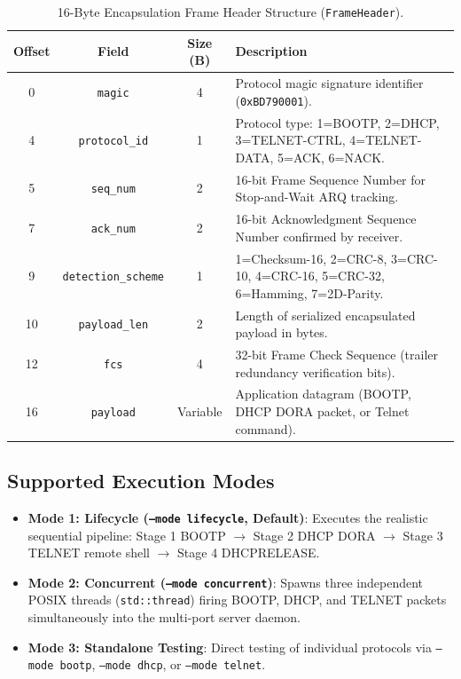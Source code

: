 \documentclass[12pt, a4paper]{article}
\begin{document}
\begin{table}[H]
\centering
\small
\begin{tabularx}{\linewidth}{|c|c|c|X|}
\hline
\textbf{Offset} & \textbf{Field} & \textbf{Size (B)} & \textbf{Description} \\ \hline
0 & \texttt{magic} & 4 & Protocol magic signature identifier (\texttt{0xBD790001}). \\ \hline
4 & \texttt{protocol\_id} & 1 & Protocol type: 1=BOOTP, 2=DHCP, 3=TELNET-CTRL, 4=TELNET-DATA, 5=ACK, 6=NACK. \\ \hline
5 & \texttt{seq\_num} & 2 & 16-bit Frame Sequence Number for Stop-and-Wait ARQ tracking. \\ \hline
7 & \texttt{ack\_num} & 2 & 16-bit Acknowledgment Sequence Number confirmed by receiver. \\ \hline
9 & \texttt{detection\_scheme} & 1 & 1=Checksum-16, 2=CRC-8, 3=CRC-10, 4=CRC-16, 5=CRC-32, 6=Hamming, 7=2D-Parity. \\ \hline
10 & \texttt{payload\_len} & 2 & Length of serialized encapsulated payload in bytes. \\ \hline
12 & \texttt{fcs} & 4 & 32-bit Frame Check Sequence (trailer redundancy verification bits). \\ \hline
16 & \texttt{payload} & Variable & Application datagram (BOOTP, DHCP DORA packet, or Telnet command). \\ \hline
\end{tabularx}
\caption{16-Byte Encapsulation Frame Header Structure (\texttt{FrameHeader}).}
\label{tab:frame_layout}
\end{table}

\subsection{Supported Execution Modes}
\begin{itemize}
    \item \textbf{Mode 1: Lifecycle (\texttt{--mode lifecycle}, Default)}: Executes the realistic sequential pipeline: Stage 1 BOOTP $\to$ Stage 2 DHCP DORA $\to$ Stage 3 TELNET remote shell $\to$ Stage 4 DHCPRELEASE.
    \item \textbf{Mode 2: Concurrent (\texttt{--mode concurrent})}: Spawns three independent POSIX threads (\texttt{std::thread}) firing BOOTP, DHCP, and TELNET packets simultaneously into the multi-port server daemon.
    \item \textbf{Mode 3: Standalone Testing}: Direct testing of individual protocols via \texttt{--mode bootp}, \texttt{--mode dhcp}, or \texttt{--mode telnet}.
\end{itemize}
\end{document}
